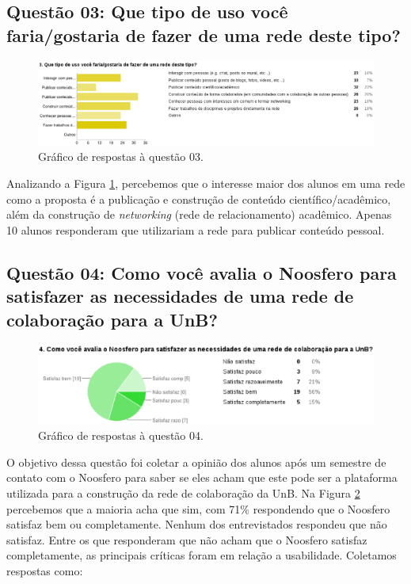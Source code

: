 \subsection*{Questão 03: Que tipo de uso você faria/gostaria de fazer de uma
rede deste tipo?}

\begin{figure}[h!]
    \centering
    \includegraphics[keepaspectratio=true,scale=0.45]
      {figuras/p3.eps}
    \caption{Gráfico de respostas à questão 03.}
    \label{response:3}
\end{figure}

Analizando a Figura \ref{response:3}, percebemos que o interesse maior dos
alunos em uma rede como a proposta é a publicação e construção de conteúdo
científico/acadêmico, além da construção de \textit{networking} (rede de
relacionamento) acadêmico. Apenas 10 alunos responderam que utilizariam a rede
para publicar conteúdo pessoal.

\subsection*{Questão 04: Como você avalia o Noosfero para satisfazer as
necessidades de uma rede de colaboração para a UnB?}

\begin{figure}[h!]
    \centering
    \includegraphics[keepaspectratio=true,scale=0.55]
      {figuras/p4.eps}
    \caption{Gráfico de respostas à questão 04.}
    \label{response:4}
\end{figure}

O objetivo dessa questão foi coletar a opinião dos alunos após um semestre de
contato com o Noosfero para saber se eles acham que este pode ser a plataforma
utilizada para a construção da rede de colaboração da UnB. Na Figura
\ref{response:4} percebemos que a maioria acha que sim, com 71\% respondendo
que o Noosfero satisfaz bem ou completamente. Nenhum dos entrevistados
respondeu que não satisfaz.
%
Entre os que responderam que não acham que o Noosfero satisfaz completamente,
as principais críticas foram em relação a usabilidade. Coletamos respostas
como:

